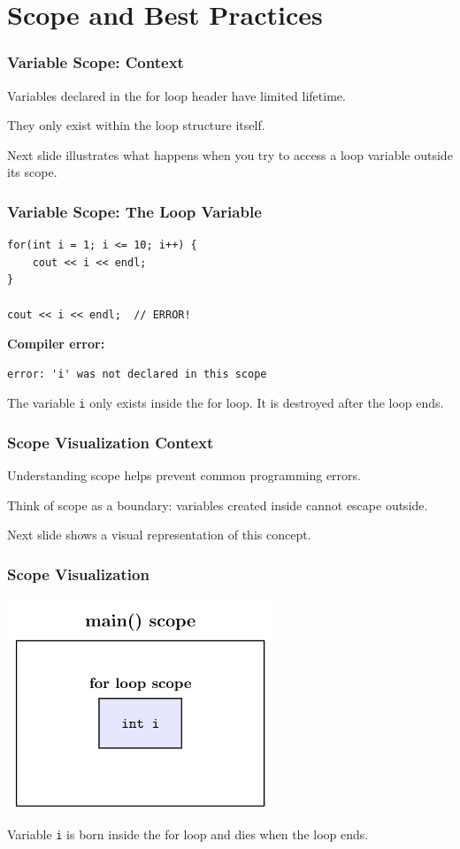 \documentclass{beamer}
\begin{document}
\section{Scope and Best Practices}

\begin{frame}
\frametitle{Variable Scope: Context}
Variables declared in the for loop header have limited lifetime.\pause

They only exist within the loop structure itself.\pause

Next slide illustrates what happens when you try to access a loop variable outside its scope.
\end{frame}

\begin{frame}[fragile]
\frametitle{Variable Scope: The Loop Variable}
\begin{verbatim}
for(int i = 1; i <= 10; i++) {
    cout << i << endl;
}

cout << i << endl;  // ERROR!
\end{verbatim}
\pause

\textbf{Compiler error:}
\begin{verbatim}
error: 'i' was not declared in this scope
\end{verbatim}
\pause

The variable \texttt{i} only exists inside the for loop. It is destroyed after the loop ends.
\end{frame}

\begin{frame}
\frametitle{Scope Visualization Context}
Understanding scope helps prevent common programming errors.\pause

Think of scope as a boundary: variables created inside cannot escape outside.\pause

Next slide shows a visual representation of this concept.
\end{frame}

\begin{frame}
\frametitle{Scope Visualization}
\includegraphics[width=0.6\textwidth]{../images/scope-loop.png}

Variable \texttt{i} is born inside the for loop and dies when the loop ends.
\end{frame}
\end{document}
